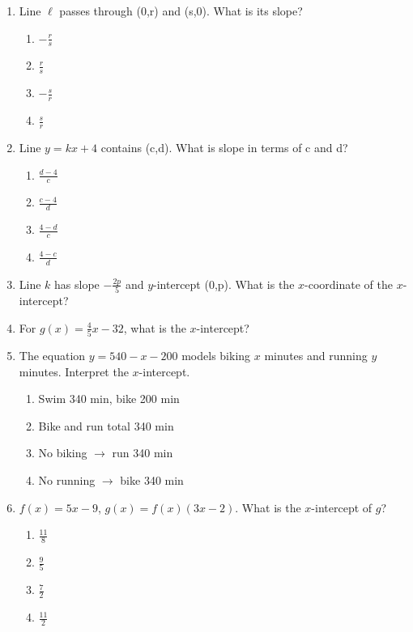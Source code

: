 \documentclass[12pt]{exam}
\begin{document}
\begin{enumerate}
\begin{enumerate}[label=\Alph*)]
    \end{enumerate}
    \item Line $\ell$ passes through (0,r) and (s,0). What is its slope?
    \begin{enumerate}[label=\Alph*)]
        \item $-\frac{r}{s}$
        \item $\frac{r}{s}$
        \item $-\frac{s}{r}$
        \item $\frac{s}{r}$
    \end{enumerate}
    \item Line $y = kx + 4$ contains (c,d). What is slope in terms of c and d?
    \begin{enumerate}[label=\Alph*)]
        \item $\frac{d - 4}{c}$
        \item $\frac{c - 4}{d}$
        \item $\frac{4 - d}{c}$
        \item $\frac{4 - c}{d}$
    \end{enumerate}
    \item Line $k$ has slope $-\frac{2p}{5}$ and $y$-intercept (0,p). What is the $x$-coordinate of the $x$-intercept?
    \item For $g(x) = \frac{4}{5}x - 32$, what is the $x$-intercept?
    \item The equation $y = 540 - x - 200$ models biking $x$ minutes and running $y$ minutes. Interpret the $x$-intercept.
    \begin{enumerate}[label=\Alph*)]
        \item Swim 340 min, bike 200 min
        \item Bike and run total 340 min
        \item No biking $\to$ run 340 min
        \item No running $\to$ bike 340 min
    \end{enumerate}
    \item $f(x) = 5x - 9$, $g(x) = f(x)(3x - 2)$. What is the $x$-intercept of $g$?
    \begin{enumerate}[label=\Alph*)]
        \item $\frac{11}{8}$
        \item $\frac{9}{5}$
        \item $\frac{7}{2}$
        \item $\frac{11}{2}$
    \end{enumerate}

\end{enumerate}
\end{document}
